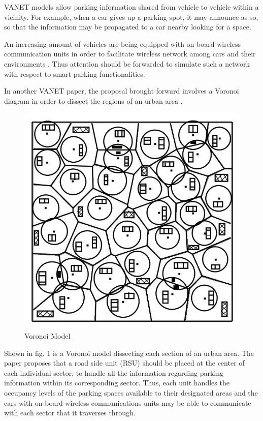 VANET models allow parking information shared from vehicle to vehicle within a vicinity. For example, when a car gives up a parking spot, it may announce as so, so that the information may be propagated to a car nearby looking for a space.

An increasing amount of vehicles are being equipped with on-board wireless communication units in order to facilitate wireless network among cars and their environments \cite{10}. Thus attention should be forwarded to simulate such a network with respect to smart parking functionalities.

In another VANET paper, the proposal brought forward involves a Voronoi diagram in order to dissect the regions of an urban area \cite{11}. 

\begin{figure}[H]
    \centering
    \includegraphics[width=1\linewidth]{./Images/VORONOI.png}
    \caption{Voronoi Model}
    \label{fig:sub1}
\end{figure}

Shown in fig. 1 is a Voronoi model dissecting each section of an urban area. The paper proposes that a road side unit (RSU) should be placed at the center of each individual sector; to handle all the information regarding parking information within its corresponding sector. Thus, each unit handles the occupancy levels of the parking spaces available to their designated areas and the cars with on-board wireless communications units may be able to communicate with each sector that it traverses through.

